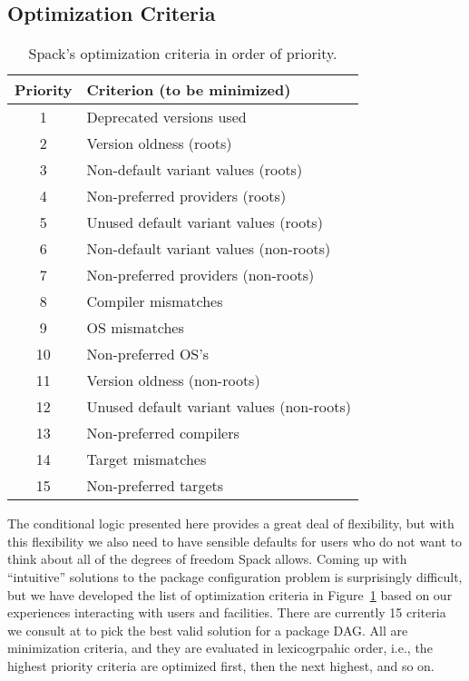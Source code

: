 \subsection{Optimization Criteria}

\begin{table}[t]
\centering
\begin{tabular}{| c || l |}
 \hline
 Priority & Criterion (to be minimized) \\
 \hline\hline
 1  & Deprecated versions used \\
 \hline
 2  & Version oldness (roots) \\
 3  & Non-default variant values (roots) \\
 4  & Non-preferred providers (roots) \\
 5  & Unused default variant values (roots) \\
 \hline
 6  & Non-default variant values (non-roots) \\
 7  & Non-preferred providers (non-roots) \\
 \hline
 8  & Compiler mismatches \\
 9  & OS mismatches \\
 10 & Non-preferred OS's \\
 \hline
 11 & Version oldness (non-roots) \\
 12 & Unused default variant values (non-roots) \\
 \hline
 13 & Non-preferred compilers \\
 14 & Target mismatches \\
 15 & Non-preferred targets \\
 \hline
\end{tabular}
\caption{
  Spack's optimization criteria in order of priority.
  \label{table:optimization-criteria}
  \vspace{-1em}
}
\end{table}

The conditional logic presented here provides a great deal of flexibility, but with this
flexibility we also need to have sensible defaults for users who do not want to think
about all of the degrees of freedom Spack allows. Coming up with ``intuitive'' solutions
to the package configuration problem is surprisingly difficult, but we have developed
the list of optimization criteria in Figure~\ref{table:optimization-criteria} based on
our experiences interacting with users and facilities. There are currently 15 criteria
we consult at to pick the best valid solution for a package DAG. All are minimization
criteria, and they are evaluated in lexicogrpahic order, i.e., the highest priority
criteria are optimized first, then the next highest, and so on.

